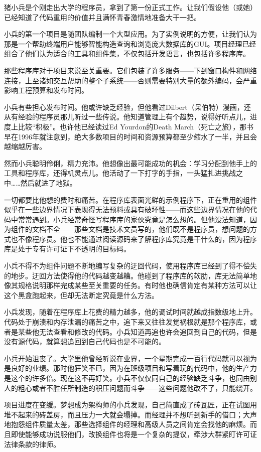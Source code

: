 \documentclass[12pt,oneside]{book}
\begin{document}
\begin{common-format}
猪小兵是个刚走出大学的程序员，拿到了第一份正式工作。让我们假设他（或她）已经知道了代码重用的价值并且满怀青春激情地准备大干一把。

小兵的第一个项目是随团队编制一个大型应用。为了实例说明的方便，让我们认为那是一个帮助终端用户能够智能构造查询和浏览庞大数据库的GUI。项目经理已经组合了他们认为适合的工具和组件集，不仅包括开发语言，也包括许多程序库。

那些程序库对于项目来说至关重要。它们包装了许多服务——下到窗口构件和网络连接，上至诸如交互帮助的整个子系统——否则需要特别大量的额外编码，会严重影响工程预算和发布时间。

小兵有些担心发布时间。他或许缺乏经验，但他看过Dilbert（呆伯特）漫画，还从有经验的程序员那儿听过一些传说。他知道管理上有个趋势，说得好听点儿，进度上比较“积极”。也许他已经读过Ed Yourdon的Death March（死亡之旅）\cite{Yourdon}，那书早在1996年就注意到，绝大多数项目的时间和资源预算都至少缩水了一半，并且会越缩越厉害。

然而小兵聪明伶俐，精力充沛。他想像出最可能成功的机会：学习分配到他手上的工具和程序库，还得机灵点儿。他活动了一下打字的手指，一头猛扎进挑战之中……然后就进了地狱。

一切都要比他想的费时和痛苦。在程序库表面光鲜的示例程序下，正在重用的组件似乎在一些边界情况下表现得无法预料或具有破坏性——而这些边界情况在他的代码中常常遇到。小兵经常奇怪写程序库的家伙究竟是怎么想的。但他没法知道，因为组件的文档不全——那些文档是技术文员写的，他们既不是程序员，想问题的方式也不像程序员。他也不能通过阅读源码来了解程序库究竟是干什么的，因为程序库是处于专有许可证下不透明的目标码。

小兵不得不为组件问题不断地编写复杂的迂回代码，使用程序库已经到了得不偿失的地步。迂回方法使得他的代码越变越糟。他碰到了程序库的软肋，库无法简单地像其规格说明那样完成某些至关重要的任务。有时他也确信肯定有某种方法可以让这个黑盒跑起来，但却无法断定究竟是什么方法。

小兵发现，随着在程序库上花费的精力越多，他的调试时间就越成指数级地上升。代码处于崩溃和内存泄漏的痛苦之中，追下来又往往发觉祸根就是那个程序库，或者是某些他无法查看和修改的代码。小兵知道再追也许会追回到自己的代码，但是没有源代码，就算想追回到自己代码也是不可能的。

小兵开始沮丧了。大学里他曾经听说在业界，一个星期完成一百行代码就可以视为是良好的业绩。那时他狂笑不已，因为在班级项目和写着玩的代码中，他的生产力是这个的许多倍。现在这不再好笑。小兵不仅仅同自己的经验缺乏斗争，也同由别人的粗心或者不胜任所制造的积压问题而斗争——这些问题他改不了，只能绕开。

项目进度在变缓。梦想成为架构师的小兵发现，自己简直成了砖瓦匠，正在试图用堆不起来的砖盖房，而且压力一大就会塌掉。而经理并不想听到新手的借口；大声地抱怨组件质量太差，那些选择组件的经理和高级人员之间肯定会找他的麻烦。而且即使能够成功说服他们，改换组件也将是一个复杂的提议，牵涉大群紧盯许可证法律条款的律师。


\end{common-format}
\end{document}
